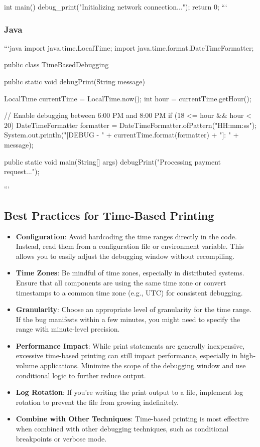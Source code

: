 \documentclass{article}
\begin{document}
{{{{int main() {
    debug_print("Initializing network connection...");
    return 0;
}
```

\subsubsection*{Java}

```java
import java.time.LocalTime;
import java.time.format.DateTimeFormatter;

public class TimeBasedDebugging {

    public static void debugPrint(String message) {
        LocalTime currentTime = LocalTime.now();
        int hour = currentTime.getHour();

        // Enable debugging between 6:00 PM and 8:00 PM
        if (18 <= hour && hour < 20) {
            DateTimeFormatter formatter = DateTimeFormatter.ofPattern("HH:mm:ss");
            System.out.println("[DEBUG - " + currentTime.format(formatter) + "]: " + message);
        }
    }

    public static void main(String[] args) {
        debugPrint("Processing payment request...");
    }
}
```

\subsection*{Best Practices for Time-Based Printing}

\begin{itemize}
    \item \textbf{Configuration}: Avoid hardcoding the time ranges directly in the code. Instead, read them from a configuration file or environment variable. This allows you to easily adjust the debugging window without recompiling.
    \item \textbf{Time Zones}: Be mindful of time zones, especially in distributed systems. Ensure that all components are using the same time zone or convert timestamps to a common time zone (e.g., UTC) for consistent debugging.
    \item \textbf{Granularity}: Choose an appropriate level of granularity for the time range. If the bug manifests within a few minutes, you might need to specify the range with minute-level precision.
    \item \textbf{Performance Impact}: While print statements are generally inexpensive, excessive time-based printing can still impact performance, especially in high-volume applications. Minimize the scope of the debugging window and use conditional logic to further reduce output.
    \item \textbf{Log Rotation}: If you're writing the print output to a file, implement log rotation to prevent the file from growing indefinitely.
    \item \textbf{Combine with Other Techniques}: Time-based printing is most effective when combined with other debugging techniques, such as conditional breakpoints or verbose mode.
\end{itemize}

}}}}
\end{document}

